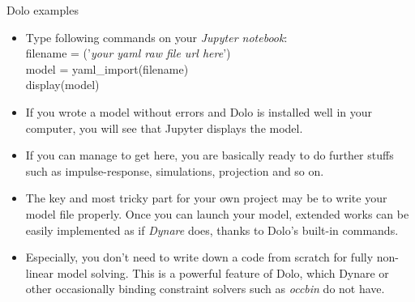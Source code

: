 \documentclass{beamer}
\begin{document}
\begin{frame}{Dolo examples}
\begin{itemize}
  
    \item Type following commands on your \textit{Jupyter notebook}:\\
    
    filename = ('\textit{your yaml raw file url here}')\\
    model = yaml\_import(filename)\\
    display(model)  

\item If you wrote a model without errors and Dolo is installed well in your computer, you will see that Jupyter displays the model. 
\item If you can manage to get here, you are basically ready to do further stuffs such as impulse-response, simulations, projection and so on.
\item The key and most tricky part for your own project may be to write your model file properly. Once you can launch your model, extended works can be easily implemented as if \textit{Dynare} does, thanks to Dolo's built-in commands. 
\item Especially, you don't need to write down a code from scratch for fully non-linear model solving. This is a powerful feature of Dolo, which Dynare or other occasionally binding constraint solvers such as \textit{occbin} do not have. 
\end{itemize}
\end{frame}
\end{document}

